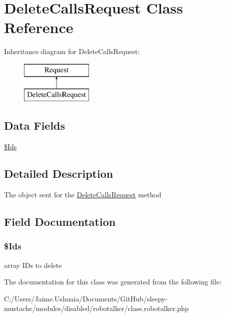 \hypertarget{class_delete_calls_request}{\section{Delete\-Calls\-Request Class Reference}
\label{class_delete_calls_request}
}
Inheritance diagram for Delete\-Calls\-Request\-:\begin{figure}[H]
\begin{center}
\leavevmode
\includegraphics[height=2.000000cm]{class_delete_calls_request}
\end{center}
\end{figure}
\subsection*{Data Fields}
\begin{DoxyCompactItemize}
\item 
\hyperlink{class_delete_calls_request_a003384fac9231dcb79d5719b16e9eed8}{\$\-Ids}
\end{DoxyCompactItemize}


\subsection{Detailed Description}
The object sent for the \hyperlink{class_delete_calls_request}{Delete\-Calls\-Request} method 

\subsection{Field Documentation}
\hypertarget{class_delete_calls_request_a003384fac9231dcb79d5719b16e9eed8}{
\subsubsection[{\$\-Ids}]{\setlength{\rightskip}{0pt plus 5cm}\$Ids}}\label{class_delete_calls_request_a003384fac9231dcb79d5719b16e9eed8}
array I\-Ds to delete 

The documentation for this class was generated from the following file\-:\begin{DoxyCompactItemize}
\item 
C\-:/\-Users/\-Jaime.\-Ushuaia/\-Documents/\-Git\-Hub/sleepy-\/mustache/modules/disabled/robotalker/class.\-robotalker.\-php\end{DoxyCompactItemize}

